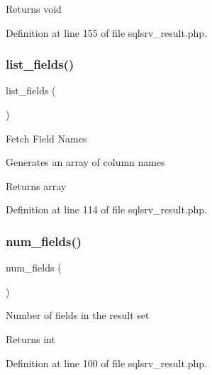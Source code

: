 \begin{DoxyReturn}{Returns}
void 
\end{DoxyReturn}


Definition at line 155 of file sqlsrv\+\_\+result.\+php.

\mbox{\label{class_c_i___d_b__sqlsrv__result_a50b54eb4ea7cfd039740f532988ea776}} 
\subsubsection{\texorpdfstring{list\_fields()}{list\_fields()}}
{\footnotesize\ttfamily list\+\_\+fields (\begin{DoxyParamCaption}{ }\end{DoxyParamCaption})}

Fetch Field Names

Generates an array of column names

\begin{DoxyReturn}{Returns}
array 
\end{DoxyReturn}


Definition at line 114 of file sqlsrv\+\_\+result.\+php.

\mbox{\label{class_c_i___d_b__sqlsrv__result_af831bf363e4d7d661a717a4932af449d}} 
\subsubsection{\texorpdfstring{num\_fields()}{num\_fields()}}
{\footnotesize\ttfamily num\+\_\+fields (\begin{DoxyParamCaption}{ }\end{DoxyParamCaption})}

Number of fields in the result set

\begin{DoxyReturn}{Returns}
int 
\end{DoxyReturn}


Definition at line 100 of file sqlsrv\+\_\+result.\+php.

\mbox{\label{class_c_i___d_b__sqlsrv__result_a218657c303ee499b97710ab0cd2f5d6e}} 
